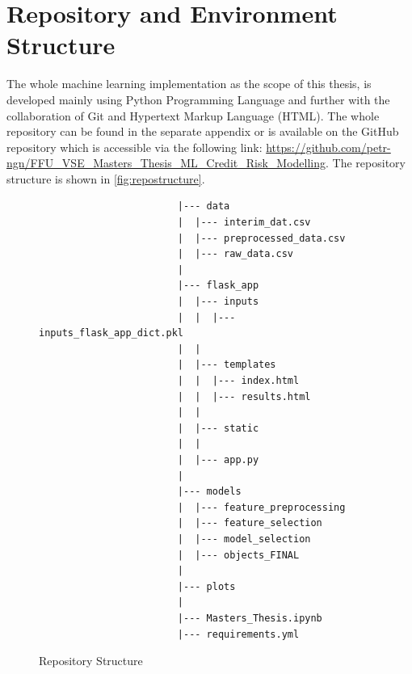 \section{Repository and Environment Structure}
\label{sec:repo}
The whole machine learning implementation as the scope of this thesis, is developed mainly using Python Programming Language and further with the collaboration of Git and Hypertext Markup Language (HTML).
The whole repository can be found in the separate appendix or is available on the GitHub repository which is accessible via the following link: \url{https://github.com/petr-ngn/FFU_VSE_Masters_Thesis_ML_Credit_Risk_Modelling}.
The repository structure is shown in \autoref{fig:repostructure}.
\begin{figure}[H]
\centering\caption{Repository Structure}
\label{fig:repostructure}

{\footnotesize
\begin{verbatim}
                        |--- data
                        |  |--- interim_dat.csv
                        |  |--- preprocessed_data.csv
                        |  |--- raw_data.csv
                        |
                        |--- flask_app
                        |  |--- inputs
                        |  |  |--- inputs_flask_app_dict.pkl
                        |  |
                        |  |--- templates
                        |  |  |--- index.html
                        |  |  |--- results.html
                        |  |
                        |  |--- static
                        |  |
                        |  |--- app.py
                        |
                        |--- models
                        |  |--- feature_preprocessing
                        |  |--- feature_selection
                        |  |--- model_selection
                        |  |--- objects_FINAL
                        |
                        |--- plots
                        |
                        |--- Masters_Thesis.ipynb
                        |--- requirements.yml
\end{verbatim}
}
\vspace{0em}
\end{figure}


